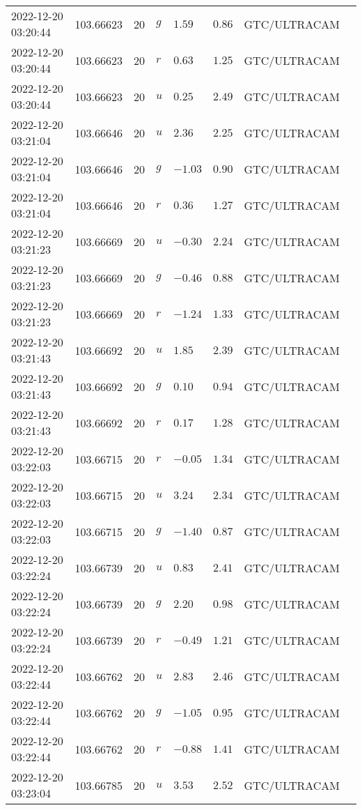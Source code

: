 \documentclass{nature_plusfigure}
\begin{document}
\begin{supplement}
\begin{center}
\begin{longtable}{llllllll}
2022-12-20 03:20:44 & 103.66623 & 20 & $g$ & $1.59$ & $0.86$ & GTC/ULTRACAM &  \\ 
2022-12-20 03:20:44 & 103.66623 & 20 & $r$ & $0.63$ & $1.25$ & GTC/ULTRACAM &  \\ 
2022-12-20 03:20:44 & 103.66623 & 20 & $u$ & $0.25$ & $2.49$ & GTC/ULTRACAM &  \\ 
2022-12-20 03:21:04 & 103.66646 & 20 & $u$ & $2.36$ & $2.25$ & GTC/ULTRACAM &  \\ 
2022-12-20 03:21:04 & 103.66646 & 20 & $g$ & $-1.03$ & $0.90$ & GTC/ULTRACAM &  \\ 
2022-12-20 03:21:04 & 103.66646 & 20 & $r$ & $0.36$ & $1.27$ & GTC/ULTRACAM &  \\ 
2022-12-20 03:21:23 & 103.66669 & 20 & $u$ & $-0.30$ & $2.24$ & GTC/ULTRACAM &  \\ 
2022-12-20 03:21:23 & 103.66669 & 20 & $g$ & $-0.46$ & $0.88$ & GTC/ULTRACAM &  \\ 
2022-12-20 03:21:23 & 103.66669 & 20 & $r$ & $-1.24$ & $1.33$ & GTC/ULTRACAM &  \\ 
2022-12-20 03:21:43 & 103.66692 & 20 & $u$ & $1.85$ & $2.39$ & GTC/ULTRACAM &  \\ 
2022-12-20 03:21:43 & 103.66692 & 20 & $g$ & $0.10$ & $0.94$ & GTC/ULTRACAM &  \\ 
2022-12-20 03:21:43 & 103.66692 & 20 & $r$ & $0.17$ & $1.28$ & GTC/ULTRACAM &  \\ 
2022-12-20 03:22:03 & 103.66715 & 20 & $r$ & $-0.05$ & $1.34$ & GTC/ULTRACAM &  \\ 
2022-12-20 03:22:03 & 103.66715 & 20 & $u$ & $3.24$ & $2.34$ & GTC/ULTRACAM &  \\ 
2022-12-20 03:22:03 & 103.66715 & 20 & $g$ & $-1.40$ & $0.87$ & GTC/ULTRACAM &  \\ 
2022-12-20 03:22:24 & 103.66739 & 20 & $u$ & $0.83$ & $2.41$ & GTC/ULTRACAM &  \\ 
2022-12-20 03:22:24 & 103.66739 & 20 & $g$ & $2.20$ & $0.98$ & GTC/ULTRACAM &  \\ 
2022-12-20 03:22:24 & 103.66739 & 20 & $r$ & $-0.49$ & $1.21$ & GTC/ULTRACAM &  \\ 
2022-12-20 03:22:44 & 103.66762 & 20 & $u$ & $2.83$ & $2.46$ & GTC/ULTRACAM &  \\ 
2022-12-20 03:22:44 & 103.66762 & 20 & $g$ & $-1.05$ & $0.95$ & GTC/ULTRACAM &  \\ 
2022-12-20 03:22:44 & 103.66762 & 20 & $r$ & $-0.88$ & $1.41$ & GTC/ULTRACAM &  \\ 
2022-12-20 03:23:04 & 103.66785 & 20 & $u$ & $3.53$ & $2.52$ & GTC/ULTRACAM &  \\ 

\end{longtable}
\end{center}
\end{supplement}
\end{document}
